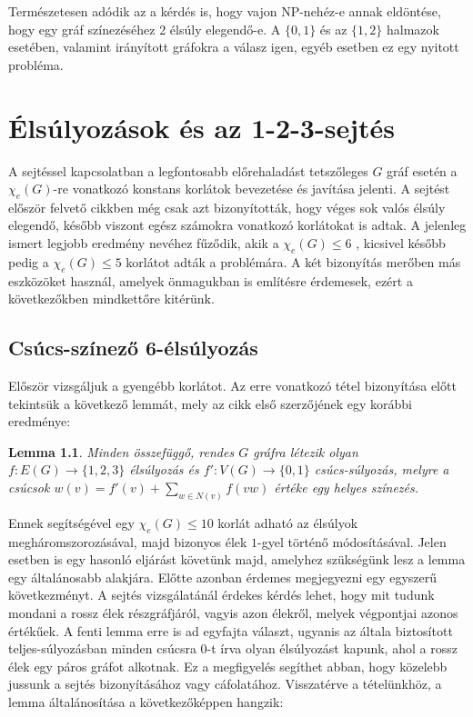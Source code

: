 \documentclass[12pt, a4paper]{report}
\newtheorem{lem}[tét]{Lemma}
\theoremstyle{remark}
\theoremstyle{definition}
\begin{document}
Természetesen adódik az a kérdés is, hogy vajon NP-nehéz-e annak eldöntése, hogy egy gráf színezéséhez 2 élsúly elegendő-e. A $\lbrace 0, 1 \rbrace$ és az $\lbrace 1, 2 \rbrace$ halmazok esetében, valamint irányított gráfokra a válasz igen, egyéb esetben ez egy nyitott probléma.

\chapter{Élsúlyozások és az 1-2-3-sejtés}
A sejtéssel kapcsolatban a legfontosabb előrehaladást tetszőleges $G$ gráf esetén a $\chi_e(G)$-re vonatkozó konstans korlátok bevezetése és javítása jelenti. A sejtést először felvető cikkben még csak azt bizonyították, hogy véges sok valós élsúly elegendő, később viszont egész számokra vonatkozó korlátokat is adtak. A jelenleg ismert legjobb eredmény \citeauthor{Kalkowski2010} nevéhez fűződik, akik a $\chi_e(G) \leq 6$ \cite{Kalkowski2009}, kicsivel később pedig a $\chi_e(G) \leq 5$ \cite{Kalkowski2010} korlátot adták a problémára. A két bizonyítás merőben más eszközöket használ, amelyek önmagukban is említésre érdemesek, ezért a következőkben mindkettőre kitérünk.

\section{Csúcs-színező 6-élsúlyozás}
Először vizsgáljuk a gyengébb korlátot. Az erre vonatkozó tétel bizonyítása előtt tekintsük a következő lemmát, mely az \cite{Kalkowski2009} cikk első szerzőjének egy korábbi eredménye:

\begin{lem}
Minden összefüggő, rendes $G$ gráfra létezik olyan $f:E(G) \rightarrow \lbrace 1, 2, 3 \rbrace$ élsúlyozás és $f':V(G) \rightarrow \lbrace 0, 1 \rbrace$ csúcs-súlyozás, melyre a csúcsok $w(v) = f'(v) + \sum\limits_{w \in N(v)} f(vw)$ értéke egy helyes színezés.
\end{lem}

Ennek segítségével egy $\chi_e(G) \leq 10$ korlát adható az élsúlyok megháromszorozásával, majd bizonyos élek $1$-gyel történő módosításával. Jelen esetben is egy hasonló eljárást követünk majd, amelyhez szükségünk lesz a lemma egy általánosabb alakjára. Előtte azonban érdemes megjegyezni egy egyszerű következményt. A sejtés vizsgálatánál érdekes kérdés lehet, hogy mit tudunk mondani a rossz élek részgráfjáról, vagyis azon élekről, melyek végpontjai azonos értékűek. A fenti lemma erre is ad egyfajta választ, ugyanis az általa biztosított teljes-súlyozásban minden csúcsra $0$-t írva olyan élsúlyozást kapunk, ahol a rossz élek egy páros gráfot alkotnak. Ez a megfigyelés segíthet abban, hogy közelebb jussunk a sejtés bizonyításához vagy cáfolatához. Visszatérve a tételünkhöz, a lemma általánosítása a következőképpen hangzik:
\end{document}

